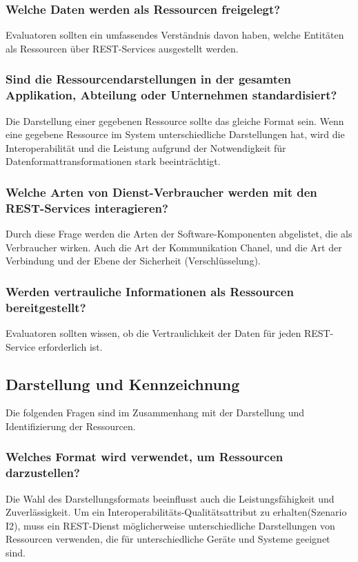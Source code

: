 \documentclass{acmsiggraph}
\begin{document}
\subsubsection{Welche Daten werden als Ressourcen freigelegt?}
Evaluatoren sollten ein umfassendes Verständnis davon haben, welche Entitäten als Ressourcen über REST-Services ausgestellt werden.
\subsubsection{Sind die Ressourcendarstellungen in der gesamten Applikation, Abteilung oder Unternehmen standardisiert?}
Die Darstellung einer gegebenen Ressource sollte das gleiche Format sein.
Wenn eine gegebene Ressource im System unterschiedliche Darstellungen hat, wird die Interoperabilität und die Leistung aufgrund der Notwendigkeit für Datenformattransformationen stark beeinträchtigt.
\subsubsection{Welche Arten von Dienst-Verbraucher werden mit den REST-Services interagieren?}
Durch diese Frage werden die Arten der Software-Komponenten abgelistet, die als Verbraucher wirken.
Auch die Art der Kommunikation Chanel, und die Art der Verbindung und der Ebene der Sicherheit (Verschlüsselung).
\subsubsection{Werden vertrauliche Informationen als Ressourcen bereitgestellt?}
Evaluatoren sollten wissen, ob die Vertraulichkeit der Daten für jeden REST-Service erforderlich ist.


\subsection{Darstellung und Kennzeichnung}
Die folgenden Fragen sind im Zusammenhang mit der Darstellung und Identifizierung der Ressourcen.
\subsubsection{Welches Format wird verwendet, um Ressourcen darzustellen?}
Die Wahl des Darstellungsformats beeinflusst auch die Leistungsfähigkeit und Zuverlässigkeit.
Um ein Interoperabilitäts-Qualitätsattribut zu erhalten(Szenario I2), muss ein REST-Dienst möglicherweise unterschiedliche Darstellungen von Ressourcen verwenden, die für unterschiedliche Geräte und Systeme geeignet sind.
\end{document}
